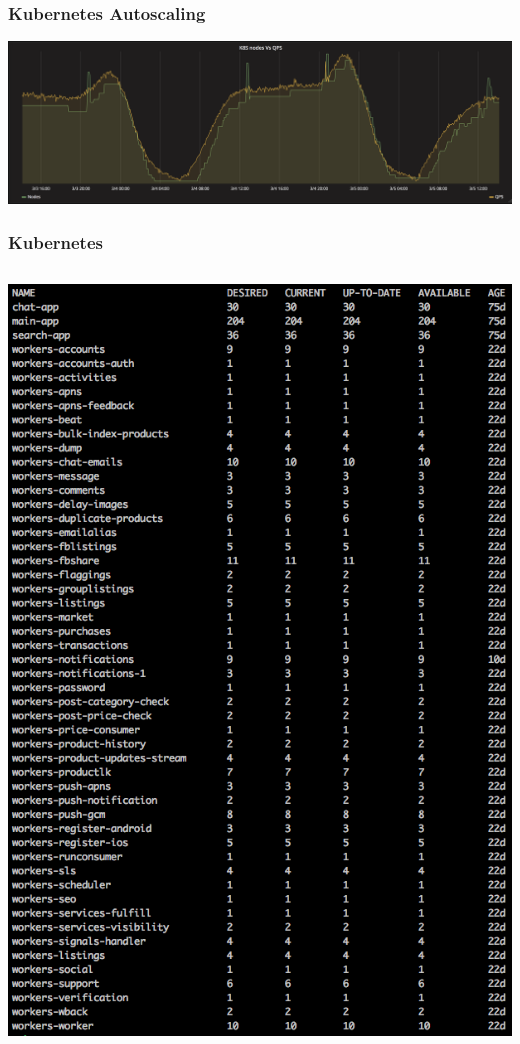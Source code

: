 \documentclass[12pt]{beamer}
\begin{document}
    \begin{frame}
        \frametitle{Kubernetes Autoscaling}
        \begin{center}
            \includegraphics[width=1\textwidth]{images/kubernetes-auto.png}
        \end{center}
    \end{frame}

    \begin{frame}
        \frametitle{Kubernetes}
        \begin{columns}
            \begin{center}
                \includegraphics[width=1\textwidth]{images/kubernetes-deploy.png}
            \end{center}


\end{columns}
\end{frame}
\end{document}
